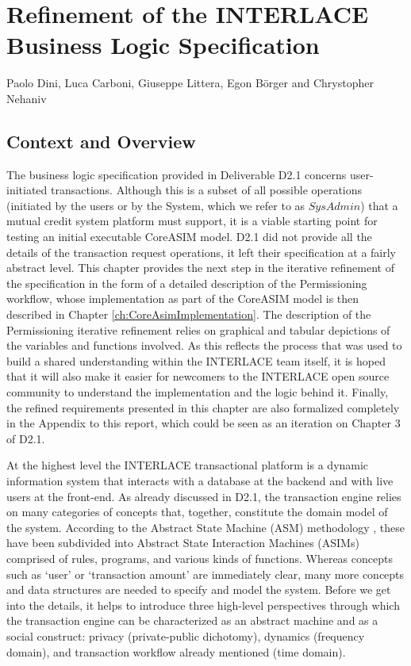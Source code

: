 \chapter{Refinement of the INTERLACE Business Logic Specification}
\label{ch:UpdatedBLS}

\vspace{-1cm}
\begin{center}
Paolo Dini, Luca Carboni, Giuseppe Littera, Egon B\"orger and Chrystopher Nehaniv
\end{center}

\section{Context and Overview}
The business logic specification provided in Deliverable D2.1 \cite{INTERLACE_D21} concerns user-initiated transactions. Although this is a subset of all possible operations (initiated by the users or by the System, which we refer to as $SysAdmin$) that a mutual credit system platform must support, it is a viable starting point for testing an initial executable CoreASIM model. D2.1 did not provide all the details of the transaction request operations, it left their specification at a fairly abstract level. This chapter provides the next step in the iterative refinement of the specification in the form of a detailed description of the Permissioning workflow, whose implementation as part of the CoreASIM model is then described in Chapter \ref{ch:CoreAsimImplementation}. The description of the Permissioning iterative refinement relies on graphical and tabular depictions of the variables and functions involved. As this reflects the process that was used to build a shared understanding within the INTERLACE team itself, it is hoped that it will also make it easier for newcomers to the INTERLACE open source community to understand the implementation and the logic behind it. Finally, the refined requirements presented in this chapter are also formalized completely in the Appendix to this report, which could be seen as an iteration on Chapter 3 of D2.1.

At the highest level the INTERLACE transactional platform is a dynamic information system that interacts with a database at the backend and with live users at the front-end. As already discussed in D2.1, the transaction engine relies on many categories of concepts that, together, constitute the domain model of the system. According to the Abstract State Machine (ASM) methodology \cite{BoergerStaerk2003,BoergerRaschke2018}, these have been subdivided into Abstract State Interaction Machines (ASIMs) 
\cite{BIOMICSD42,BIOMICSD52} comprised of rules, programs, and various kinds of functions. Whereas concepts such as `user' or `transaction amount' are immediately clear, many more concepts and data structures are needed to specify and model the system. Before we get into the details, it helps to introduce three high-level perspectives through which the transaction engine can be characterized as an abstract machine and as a social construct: privacy (private-public dichotomy), dynamics (frequency domain), and transaction workflow already mentioned (time domain).

